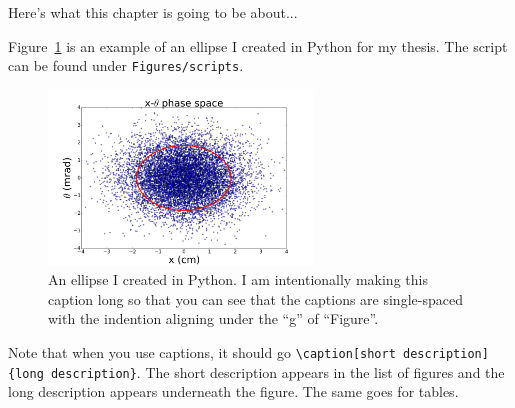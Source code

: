 Here's what this chapter is going to be about...

\label{sec:ellipses}\par
Figure~\ref{fig:ellipse} is an example of an ellipse I created in Python for my thesis. The script can be found under \texttt{Figures/scripts}.
\begin{figure}[h!]
\centering
\includegraphics*[width=70mm]{Figures/ellipse0}
\caption[An ellipse.]{An ellipse I created in Python. I am intentionally making this caption long so that you can see that the captions are single-spaced with the indention aligning under the ``g'' of ``Figure''.}
\label{fig:ellipse}
\end{figure}
Note that when you use captions, it should go \verb|\caption[short description]{long description}|. The short description appears in the list of figures and the long description appears underneath the figure. The same goes for tables\cite{jkunz}.
